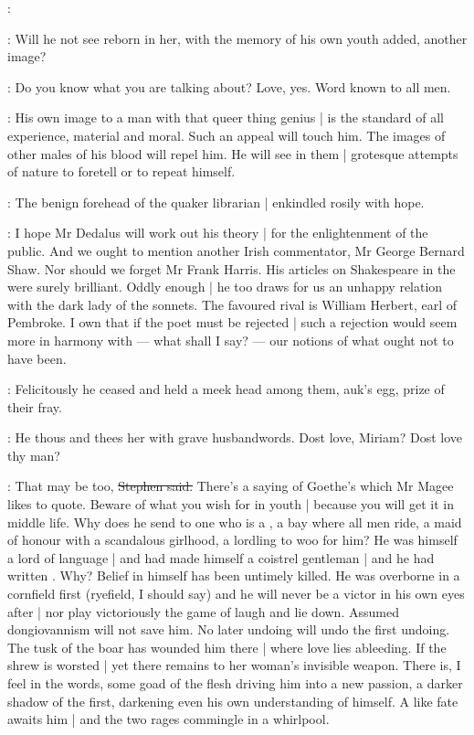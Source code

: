 \best:

\Stephen:
Will he not see reborn in her,
with the memory of his own youth added,
another image?

\StephenInt:
Do you know what you are talking about?
Love,
yes.
Word known to all men.

\Stephen:
His own image to a man with that queer thing genius |
is the standard of all experience,
material and moral.
Such an appeal will touch him.
The images of other males of his blood will repel him.
He will see in them |
grotesque attempts of nature to foretell or to repeat himself.

:
The benign forehead of the quaker librarian |
enkindled rosily with hope.

\librarian:
I hope Mr Dedalus will work out his theory |
for the enlightenment of the public.
And we ought to mention another Irish commentator,
Mr George Bernard Shaw.
Nor should we forget Mr Frank Harris.
His articles on Shakespeare in the  were surely brilliant.
Oddly enough |
he too draws for us an unhappy relation with the dark lady of the sonnets.
The favoured rival is William Herbert, earl of Pembroke.
I own that if the poet must be rejected |
such a rejection would seem more in harmony with ---
what shall I say? ---
our notions of what ought not to have been.

:
Felicitously he ceased and held a meek head among them,
auk's egg,
prize of their fray.

\StephenInt:
He thous and thees her with grave husbandwords.
Dost love,
Miriam?
Dost love thy man?

\Stephen:
That may be too,
\sout{Stephen said.}
There's a saying of Goethe's
which Mr Magee likes to quote.
Beware of what you wish for in youth |
because you will get it in middle life.
Why does he send to one who is a ,
a bay where all men ride,
a maid of honour with a scandalous girlhood,
a lordling to woo for him?
He was himself a lord of language |
and had made himself a coistrel gentleman |
and he had written .
Why?
Belief in himself has been untimely killed.
He was overborne in a cornfield first
(ryefield, I should say)
and he will never be a victor in his own eyes after |
nor play victoriously the game of laugh and lie down.
Assumed dongiovannism will not save him.
No later undoing will undo the first undoing.
The tusk of the boar has wounded him there |
where love lies ableeding.
If the shrew is worsted |
yet there remains to her woman's invisible weapon.
There is,
I feel in the words,
some goad of the flesh driving him into a new passion,
a darker shadow of the first,
darkening even his own understanding of himself.
A like fate awaits him |
and the two rages commingle in a whirlpool.

